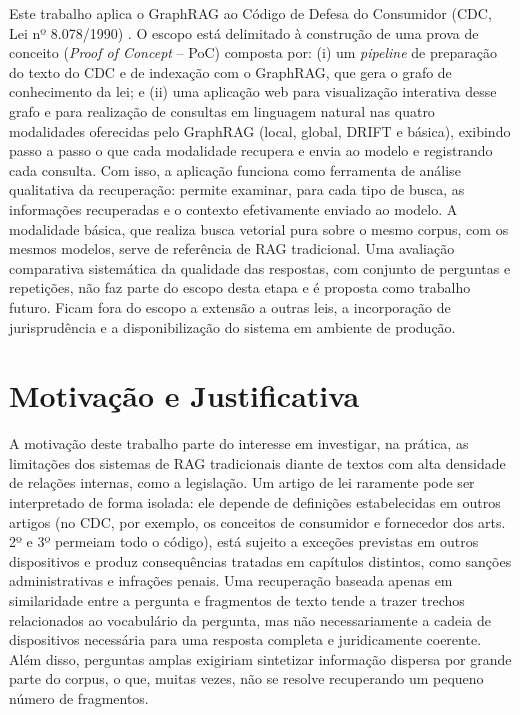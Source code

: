 Este trabalho aplica o GraphRAG ao Código de Defesa do Consumidor (CDC, Lei nº 8.078/1990) \cite{brasil1990cdc}. O escopo está delimitado à construção de uma prova de conceito (\textit{Proof of Concept} -- PoC) composta por: (i) um \textit{pipeline} de preparação do texto do CDC e de indexação com o GraphRAG, que gera o grafo de conhecimento da lei; e (ii) uma aplicação web para visualização interativa desse grafo e para realização de consultas em linguagem natural nas quatro modalidades oferecidas pelo GraphRAG (local, global, DRIFT e básica), exibindo passo a passo o que cada modalidade recupera e envia ao modelo e registrando cada consulta. Com isso, a aplicação funciona como ferramenta de análise qualitativa da recuperação: permite examinar, para cada tipo de busca, as informações recuperadas e o contexto efetivamente enviado ao modelo. A modalidade básica, que realiza busca vetorial pura sobre o mesmo corpus, com os mesmos modelos, serve de referência de RAG tradicional. Uma avaliação comparativa sistemática da qualidade das respostas, com conjunto de perguntas e repetições, não faz parte do escopo desta etapa e é proposta como trabalho futuro. Ficam fora do escopo a extensão a outras leis, a incorporação de jurisprudência e a disponibilização do sistema em ambiente de produção.

\section{Motivação e Justificativa}
\label{sec-intro-motjus}

A motivação deste trabalho parte do interesse em investigar, na prática, as limitações dos sistemas de RAG tradicionais diante de textos com alta densidade de relações internas, como a legislação. Um artigo de lei raramente pode ser interpretado de forma isolada: ele depende de definições estabelecidas em outros artigos (no CDC, por exemplo, os conceitos de consumidor e fornecedor dos arts. 2º e 3º permeiam todo o código), está sujeito a exceções previstas em outros dispositivos e produz consequências tratadas em capítulos distintos, como sanções administrativas e infrações penais. Uma recuperação baseada apenas em similaridade entre a pergunta e fragmentos de texto tende a trazer trechos relacionados ao vocabulário da pergunta, mas não necessariamente a cadeia de dispositivos necessária para uma resposta completa e juridicamente coerente. Além disso, perguntas amplas exigiriam sintetizar informação dispersa por grande parte do corpus, o que, muitas vezes, não se resolve recuperando um pequeno número de fragmentos.

